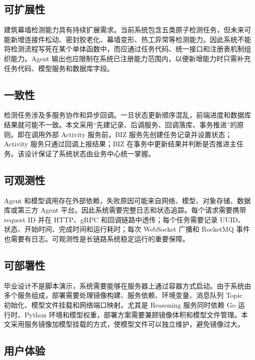 \subsection{可扩展性}
\label{subsec:scalability-analysis}

建筑幕墙检测能力具有持续扩展需求。当前系统包含五类原子检测任务，但未来可能新增连接件松动、密封胶老化、幕墙变形、热工异常等检测能力。因此系统不能将检测流程写死在某个单体函数中，而应通过任务代码、统一接口和注册表机制组织能力。Agent 输出也应限制在系统已注册能力范围内，以便新增能力时只需补充任务代码、模型服务和数据库字段。

\subsection{一致性}
\label{subsec:consistency-analysis}

检测任务涉及多服务协作和异步回调。一旦状态更新顺序混乱，前端进度和数据库结果就可能不一致。本文采用“先建记录、后调服务、回调落库、事务推进”的原则。即在调用外部 Activity 服务前，BIZ 服务先创建任务记录并设置状态；Activity 服务只通过回调上报结果；BIZ 在事务中更新结果并判断是否推进主任务。该设计保证了系统状态由业务中心统一掌握。

\subsection{可观测性}
\label{subsec:observability-analysis}

Agent 和模型调用存在外部依赖，失败原因可能来自网络、模型、对象存储、数据库或第三方 Agent 平台。因此系统需要完整日志和状态追踪。每个请求需要携带 request ID 并在 HTTP、gRPC 和回调链路中透传；每个任务需要记录 UUID、状态、开始时间、完成时间和运行耗时；每次 WebSocket 广播和 RocketMQ 事件也需要有日志。可观测性是长链路系统稳定运行的重要保障。

\subsection{可部署性}
\label{subsec:deployability-analysis}

毕业设计不是脚本演示，系统需要能够在服务器上通过容器方式启动。由于系统由多个服务组成，部署需要处理镜像构建、服务依赖、环境变量、消息队列 Topic 初始化、模型文件挂载和网络端口映射。尤其是 Reasoning 服务同时依赖 Go 运行时、Python 环境和模型权重，部署方案需要兼顾镜像体积和模型文件管理。本文采用服务镜像加模型挂载的方式，使模型文件可以独立维护，避免镜像过大。

\subsection{用户体验}
\label{subsec:ux-analysis}

